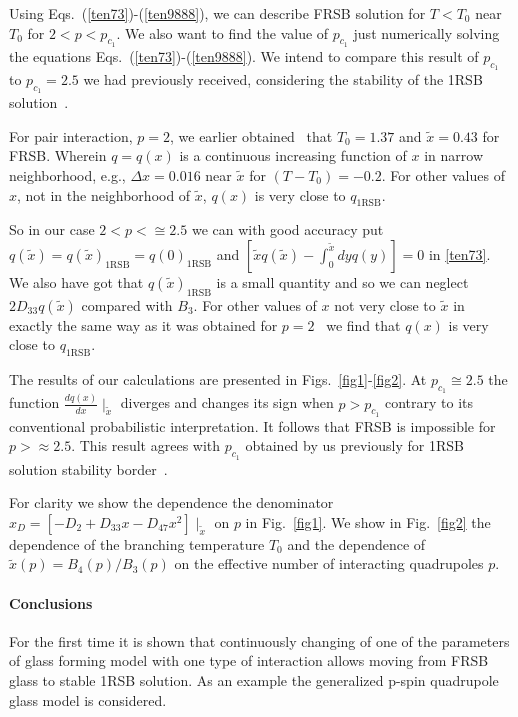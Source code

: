 \documentclass{jetpl}
\DeclareMathOperator{\RSB}{\mathrm{\scriptscriptstyle 1RSB}}
\begin{document}
Using Eqs.~(\ref{ten73})-(\ref{ten9888}), we can describe FRSB solution for $T<T_{0}$ near $T_{0}$ for $2 <p <p_{c_{1}}$. We also want to find the value of $p_{c_{1}}$ just numerically solving the equations Eqs.~(\ref{ten73})-(\ref{ten9888}). We intend to compare this result of $p_{c_{1}}$  to $p_{c_{1}}=2.5$ we had previously received, considering the stability of the 1RSB solution~\cite{JPA}.

For pair interaction, $p=2$, we earlier obtained~\cite{schel} that $T_{0} = 1.37$ and $\tilde{x} = 0.43$ for FRSB. Wherein $q=q(x)$ is a continuous increasing function of $x$ in narrow neighborhood, e.g., $\Delta x=0.016$ near $\tilde{x}$ for $(T-T_{0}) = -0.2$. For other values of $x$, not in the neighborhood of $\tilde{x}$, $q(x)$ is very close to $q_{\RSB}$.

So in our case $2 <p <\cong 2.5$ we can with good accuracy put $q(\tilde{{x}})=q(\tilde{{x}})_{\RSB}= q({0})_{\RSB}$ and $[\tilde{x}q(\tilde{x})-\int_{0}^{\tilde{x}}dy q(y)]= 0$ in \eqref{ten73}.  We also have got that $q(\tilde{x})_{\RSB}$ is a small quantity and so we can neglect $2D_{33}q({\tilde{x}})$ compared with $B_{3}$. For other values of $x$ not very close to $\tilde{x}$ in exactly the same way as it was obtained for $p=2$~\cite{schel} we find that $q(x)$ is very close to $q_{\RSB}$.

The results of our calculations are presented in Figs.~\ref{fig1}-\ref{fig2}. At $p_{c_{1}}\cong 2.5$ the function $\frac{dq(x)}{dx }\mid _{\tilde{x}}$ diverges and changes its sign when $p>p_{c_{1}}$ contrary to its conventional probabilistic interpretation. It follows that FRSB is impossible for $p>\approx 2.5$. This result agrees with $p_{c_{1}}$ obtained by us previously for 1RSB solution stability border~\cite{JPA}.

For clarity we show the dependence the denominator   $x_D=\left[-D_{2}+D_{33}x-D_{47}x^{2}\right]\mid_{\tilde{x}}$ on $p$ in Fig.~\ref{fig1}. We show in Fig.~\ref{fig2} the dependence of the branching temperature $T_{0}$  and the dependence of $\tilde{x}(p)={{B_{4}}(p)/{B_{3}}}(p)$ on the effective number of interacting quadrupoles $p$.


\paragraph*{Conclusions \label{Sec:Conc}}

For the first time it is shown that continuously changing of one of the parameters of glass forming model with one type of interaction allows moving from FRSB glass to stable 1RSB solution. As an example the generalized p-spin quadrupole glass model is considered.
\end{document}
